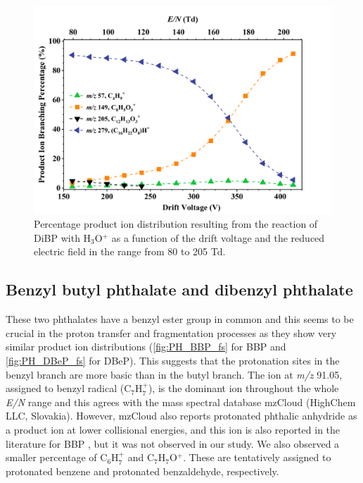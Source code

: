 \begin{figure}[htbp]
\centering
\includegraphics[height=0.4\textheight]{pics/DiBP-BR.png}
\caption{Percentage product ion distribution resulting from the reaction of DiBP with H$_3$O$^+$ as a function of the drift voltage and the reduced electric field in the range from 80 to 205 Td.}
\label{fig:PH_DiBP_fs}
\end{figure}

\subsection{Benzyl butyl phthalate
and dibenzyl phthalate}



These two phthalates have a benzyl ester group in common and this seems to be crucial in the proton transfer and fragmentation processes as they show very similar product ion distributions (\autoref{fig:PH_BBP_fs} for BBP and \autoref{fig:PH_DBeP_fs} for DBeP).
This suggests that the protonation sites in the benzyl branch are more basic than in the butyl branch.
The ion at \textit{m/z} 91.05, assigned to benzyl radical (C$_7$H$_7^+$), is the dominant ion throughout the whole \textit{E/N} range and this agrees with the mass spectral database mzCloud (HighChem LLC, Slovakia). However, mzCloud also reports protonated phthalic anhydride as a product ion at lower collisional energies, and this ion is also reported in the literature for BBP  \cite{earls2003gas}, but it was not observed in our study. 
We also observed a smaller percentage of C$_6$H$_7^+$ and C$_7$H$_7$O$^+$. These are  tentatively assigned to protonated benzene and protonated benzaldehyde, respectively.




